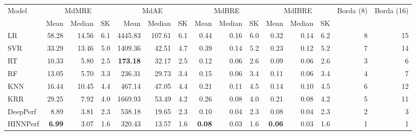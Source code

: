 \begin{tabular}{lrrrrrrrrrrrrrr}
\toprule
Model & \multicolumn{3}{c}{MdMRE} & \multicolumn{3}{c}{MdAE} & \multicolumn{3}{c}{MdBRE} & \multicolumn{3}{c}{MdIBRE} & Borda (8) & Borda (16) \\
 & Mean & Median & SK & Mean & Median & SK & Mean & Median & SK & Mean & Median & SK &  &  \\
\midrule
LR & 58.28 & 14.56 & 6.1 & 4445.83 & 107.61 & 6.1 & 0.44 & 0.16 & 6.0 & 0.32 & 0.14 & 6.2 & 8 & 15 \\
SVR & 33.29 & 13.46 & 5.0 & 1409.36 & 42.51 & 4.7 & 0.39 & 0.14 & 5.2 & 0.23 & 0.12 & 5.2 & 7 & 14 \\
RT & 10.33 & 5.80 & 2.5 & \textbf{173.18} & 32.17 & 2.5 & 0.12 & 0.06 & 2.6 & 0.09 & 0.06 & 2.6 & 3 & 6 \\
RF & 13.05 & 5.70 & 3.3 & 236.31 & 29.73 & 3.4 & 0.15 & 0.06 & 3.4 & 0.11 & 0.06 & 3.4 & 4 & 7 \\
KNN & 16.44 & 10.45 & 4.4 & 467.14 & 47.05 & 4.4 & 0.21 & 0.11 & 4.5 & 0.14 & 0.10 & 4.5 & 6 & 12 \\
KRR & 29.25 & 7.92 & 4.0 & 1669.93 & 53.49 & 4.2 & 0.26 & 0.08 & 4.0 & 0.21 & 0.08 & 4.2 & 5 & 11 \\
DeepPerf & 8.89 & 3.81 & 2.3 & 538.18 & 19.65 & 2.3 & 0.10 & 0.04 & 2.3 & 0.08 & 0.04 & 2.3 & 2 & 3 \\
HINNPerf & \textbf{6.99} & 3.07 & 1.6 & 320.43 & 13.57 & 1.6 & \textbf{0.08} & 0.03 & 1.6 & \textbf{0.06} & 0.03 & 1.6 & 1 & 1 \\
\bottomrule
\end{tabular}
